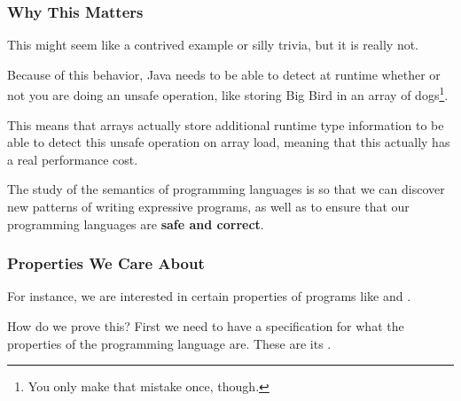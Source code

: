\documentclass[aspectratio=169, handout]{beamer}
\begin{document}
\begin{frame}[fragile]
  \frametitle{Why This Matters}

  This might seem like a contrived example or silly trivia, but it is
  really not.

  \pause
  \vspace{\fill}

  Because of this behavior, Java needs to be able to detect at runtime
  whether or not you are doing an unsafe operation, like storing Big Bird
  in an array of dogs\footnote{You only make that mistake once, though.}.

  \pause
  \vspace{\fill}

  This means that arrays actually store additional runtime type information
  to be able to detect this unsafe operation on array load, meaning that
  this actually has a real performance cost.

  \pause
  \vspace{\fill}

  The study of the semantics of programming languages is so that we can
  discover new patterns of writing expressive programs, as well as to
  ensure that our programming languages are \textbf{safe and correct}.
\end{frame}

\begin{frame}[fragile]
  \frametitle{Properties We Care About}

  For instance, we are interested in certain properties of programs like
   and .

  \pause
  \vspace{\fill}


  \pause
  \vspace{\fill}


  \pause
  \vspace{\fill}

  How do we prove this? First we need to have a specification for
  what the properties of the programming language are. These are its
  .
\end{frame}
\end{document}
